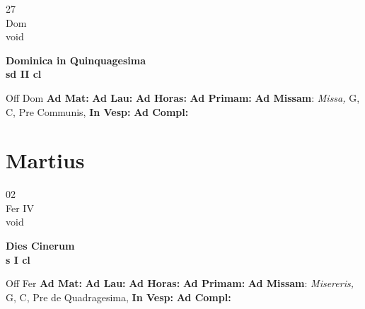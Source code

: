 \documentclass[10pt, openany]{book}
\begin{document}
    \begin{center}
        \begin{minipage}{3.5in}
            \vspace{2em}
            \begin{minipage}{0.5in}
                {\Huge 27} \\
                {\normalsize Dom} \\
                {\normalsize void}
            \end{minipage}
            \begin{minipage}{3.0in}
                \textbf{ \large Dominica in Quinquagesima \\
                \textnormal{\normalsize sd II cl}} \\ 
            \end{minipage}
            \begin{justify}Off Dom
                \textbf{Ad Mat: }
                \textbf{Ad Lau: }
                \textbf{Ad Horas: }
                \textbf{Ad Primam: }\textbf{Ad Missam}: \textit{Missa,} G, C, Pre Communis,  
                \textbf{In Vesp: }
                \textbf{Ad Compl: }
            \end{justify}
        \end{minipage}
    \end{center}

    \chapter{Martius}
                    
    \begin{center}
        \begin{minipage}{3.5in}
            \vspace{2em}
            \begin{minipage}{0.5in}
                {\Huge 02} \\
                {\normalsize Fer IV} \\
                {\normalsize void}
            \end{minipage}
            \begin{minipage}{3.0in}
                \textbf{ \large Dies Cinerum \\
                \textnormal{\normalsize s I cl}} \\ 
            \end{minipage}
            \begin{justify}Off Fer
                \textbf{Ad Mat: }
                \textbf{Ad Lau: }
                \textbf{Ad Horas: }
                \textbf{Ad Primam: }\textbf{Ad Missam}: \textit{Misereris,} G, C, Pre de Quadragesima,  
                \textbf{In Vesp: }
                \textbf{Ad Compl: }
            \end{justify}
        \end{minipage}
    \end{center}
\end{document}
